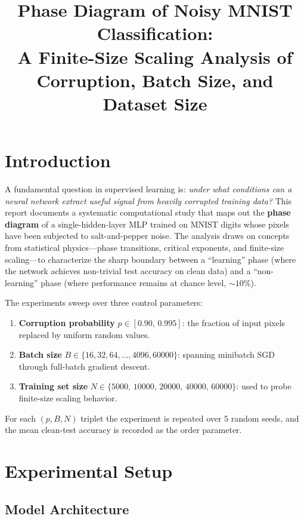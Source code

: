 \documentclass[11pt,a4paper]{article}
\title{Phase Diagram of Noisy MNIST Classification:\\
  A Finite-Size Scaling Analysis of Corruption, Batch Size, and Dataset Size}
\author{}
\date{}
\begin{document}
\maketitle

\section{Introduction}

A fundamental question in supervised learning is: \emph{under what conditions can a neural network extract useful signal from heavily corrupted training data?}
This report documents a systematic computational study that maps out the \textbf{phase diagram} of a single-hidden-layer MLP trained on MNIST digits whose pixels have been subjected to salt-and-pepper noise.
The analysis draws on concepts from statistical physics---phase transitions, critical exponents, and finite-size scaling---to characterize the sharp boundary between a ``learning'' phase (where the network achieves non-trivial test accuracy on clean data) and a ``non-learning'' phase (where performance remains at chance level, ${\sim}10\%$).

The experiments sweep over three control parameters:
\begin{enumerate}
  \item \textbf{Corruption probability} $p \in [0.90,\, 0.995]$: the fraction of input pixels replaced by uniform random values.
  \item \textbf{Batch size} $B \in \{16, 32, 64, \ldots, 4096, 60000\}$: spanning minibatch SGD through full-batch gradient descent.
  \item \textbf{Training set size} $N \in \{5000,\, 10000,\, 20000,\, 40000,\, 60000\}$: used to probe finite-size scaling behavior.
\end{enumerate}
For each $(p, B, N)$ triplet the experiment is repeated over 5 random seeds, and the mean clean-test accuracy is recorded as the order parameter.

\section{Experimental Setup}

\subsection{Model Architecture}
\end{document}
